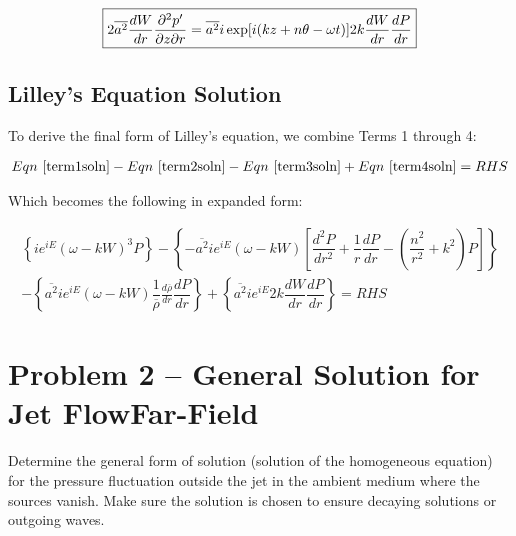 \documentclass[]{aiaa-tc}%
\begin{document}
\begin{equation} \label{term4soln}
\boxed{2\overline{a^2} \dfrac{dW}{dr}\dfrac{\partial^2p'}{\partial z\partial r}
  = \overline{a^2} i\exp[i(kz + n\theta -\omega t)]
    2k \dfrac{dW}{dr} \dfrac{dP}{dr} } \\
\end{equation}




\subsection{Lilley's Equation Solution}

To derive the final form of Lilley's equation, we combine Terms 1 through 4:

\begin{align*}
Eqn~\ref{term1soln} - Eqn~\ref{term2soln} - Eqn~\ref{term3soln} + Eqn~\ref{term4soln} = RHS
\end{align*}

Which becomes the following in expanded form:

\begin{align*}
\left\{ ie^{iE} (\omega - kW)^3 P \right\}
- \left\{ - \overline{a^2} ie^{iE}
    (\omega - kW) \left[ \dfrac{d^2P}{dr^2}
    + \dfrac{1}{r} \dfrac{dP}{dr}
    - \left( \dfrac{n^2}{r^2} + k^2 \right) P \right] \right\} \\
- \left\{ \overline{a^2} ie^{iE} (\omega - kW)
    \dfrac{1}{\overline{\rho}}\frac{d \overline{\rho}}{dr} \dfrac{dP}{dr} \right\}
+ \left\{ \overline{a^2} ie^{iE} 2k \dfrac{dW}{dr} \dfrac{dP}{dr} \right\}
= RHS
\end{align*}









\section{Problem 2 -- General Solution for Jet FlowFar-Field} %

Determine the general form of solution (solution of the homogeneous equation) for the pressure fluctuation outside the jet in the ambient medium where the sources vanish. Make sure the solution is chosen to ensure decaying solutions or outgoing waves.
\end{document}
